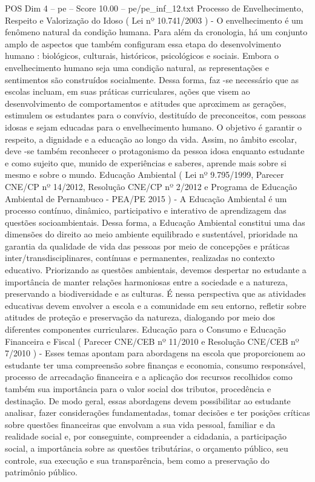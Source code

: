 \begin{textsample}{POS Dim 4 – pe – Score 10.00 – pe/pe\_inf\_12.txt}
Processo de Envelhecimento, Respeito e Valorização do Idoso ( Lei nº 10.741/2003 ) - O envelhecimento é um fenômeno natural da condição humana.
Para além da cronologia, há um conjunto amplo de aspectos que também configuram essa etapa do desenvolvimento humano : biológicos, culturais, históricos, psicológicos e sociais.
Embora o envelhecimento humano seja uma condição natural, as representações e sentimentos são construídos socialmente.
Dessa forma, faz -se necessário que as escolas incluam, em suas práticas curriculares, ações que visem ao desenvolvimento de comportamentos e atitudes que aproximem as gerações, estimulem os estudantes para o convívio, destituído de preconceitos, com pessoas idosas e sejam educadas para o envelhecimento humano.
O objetivo é garantir o respeito, a dignidade e a educação ao longo da vida.
Assim, no âmbito escolar, deve -se também reconhecer o protagonismo da pessoa idosa enquanto estudante e como sujeito que, munido de experiências e saberes, aprende mais sobre si mesmo e sobre o mundo.
Educação Ambiental ( Lei nº 9.795/1999, Parecer CNE/CP nº 14/2012, Resolução CNE/CP nº 2/2012 e Programa de Educação Ambiental de Pernambuco - PEA/PE 2015 ) - A Educação Ambiental é um processo contínuo, dinâmico, participativo e interativo de aprendizagem das questões socioambientais.
Dessa forma, a Educação Ambiental constitui uma das dimensões do direito ao meio ambiente equilibrado e sustentável, prioridade na garantia da qualidade de vida das pessoas por meio de concepções e práticas inter/transdisciplinares, contínuas e permanentes, realizadas no contexto educativo.
Priorizando as questões ambientais, devemos despertar no estudante a importância de manter relações harmoniosas entre a sociedade e a natureza, preservando a biodiversidade e as culturas.
É nessa perspectiva que as atividades educativas devem envolver a escola e a comunidade em seu entorno, refletir sobre atitudes de proteção e preservação da natureza, dialogando por meio dos diferentes componentes curriculares.
Educação para o Consumo e Educação Financeira e Fiscal ( Parecer CNE/CEB nº 11/2010 e Resolução CNE/CEB nº 7/2010 ) - Esses temas apontam para abordagens na escola que proporcionem ao estudante ter uma compreensão sobre finanças e economia, consumo responsável, processo de arrecadação financeira e a aplicação dos recursos recolhidos como também sua importância para o valor social dos tributos, procedência e destinação.
De modo geral, essas abordagens devem possibilitar ao estudante analisar, fazer considerações fundamentadas, tomar decisões e ter posições críticas sobre questões financeiras que envolvam a sua vida pessoal, familiar e da realidade social e, por conseguinte, compreender a cidadania, a participação social, a importância sobre as questões tributárias, o orçamento público, seu controle, sua execução e sua transparência, bem como a preservação do patrimônio público.

\end{textsample}
